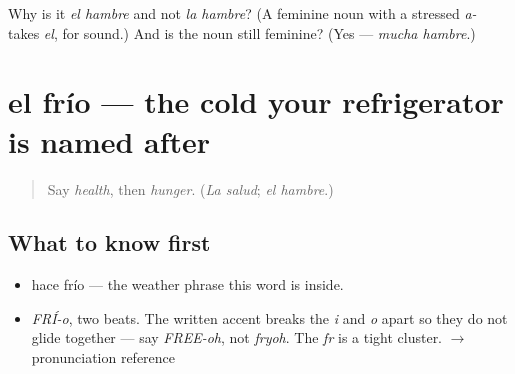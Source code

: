 \begin{tcolorbox}[breakable,colback=teal!4,colframe=teal!35!black,title={Before you move on}]
Why is it \emph{el hambre} and not \emph{la hambre}? (A feminine noun with a stressed \emph{a-} takes \emph{el}, for sound.) And is the noun still feminine? (Yes — \emph{mucha hambre}.)
\end{tcolorbox}
\section[el frío]{el frío — the cold your refrigerator is named after}

\label{lesson:ES-C334-frio}



\begin{quote}
Say \emph{health}, then \emph{hunger}. (\emph{La salud}; \emph{el hambre}.)
\end{quote}

\subsection*{What to know first}
\begin{itemize}
\raggedright
  \item hace frío — the weather phrase this word is inside.
\end{itemize}

\begin{sounds}
\begin{itemize}
\raggedright
  \item \emph{FRÍ-o}, two beats. The written accent breaks the \emph{i} and \emph{o} apart so they do not glide together — say \emph{FREE-oh}, not \emph{fryoh}. The \emph{fr} is a tight cluster. $\to$ pronunciation reference
\end{itemize}
\end{sounds}

